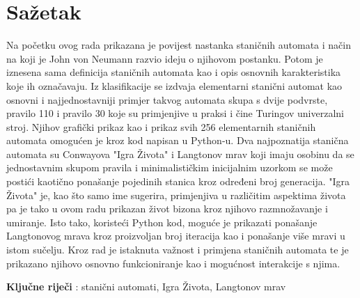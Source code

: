 \documentclass[11pt]{article}
\begin{document}
	 \section{Sažetak}\label{sazetak}
Na početku ovog rada prikazana je povijest nastanka staničnih automata i način na koji je John von Neumann razvio ideju o njihovom postanku. Potom je iznesena sama definicija staničnih automata kao i opis osnovnih karakteristika koje ih označavaju. Iz klasifikacije se izdvaja elementarni stanični automat kao osnovni i najjednostavniji primjer takvog automata skupa s dvije podvrste, pravilo 110 i pravilo 30 koje su primjenjive u praksi i čine Turingov univerzalni stroj. Njihov grafički prikaz kao i prikaz svih 256 elementarnih staničnih automata omogućen je kroz kod napisan u Python-u. 
Dva najpoznatija stanična automata su Conwayova "Igra Života" i Langtonov mrav koji imaju osobinu da se jednostavnim skupom pravila i minimalističkim inicijalnim uzorkom se može postići kaotično ponašanje pojedinih stanica kroz određeni broj generacija. "Igra Života" je, kao što samo ime sugerira, primjenjiva u različitim aspektima života pa je tako u ovom radu prikazan život bizona kroz njihovo razmnožavanje i umiranje. Isto tako, koristeći Python kod, moguće je prikazati ponašanje Langtonovog mrava kroz proizvoljan broj iteracija kao i ponašanje više mravi u istom sučelju. 
Kroz rad je istaknuta važnost i primjena staničnih automata te je prikazano njihovo osnovno funkcioniranje kao i mogućnost interakcije s njima.


\vspace {5mm}
\textbf{Ključne riječi} : stanični automati, Igra Života, Langtonov mrav
\clearpage

\clearpage
\end{document}
